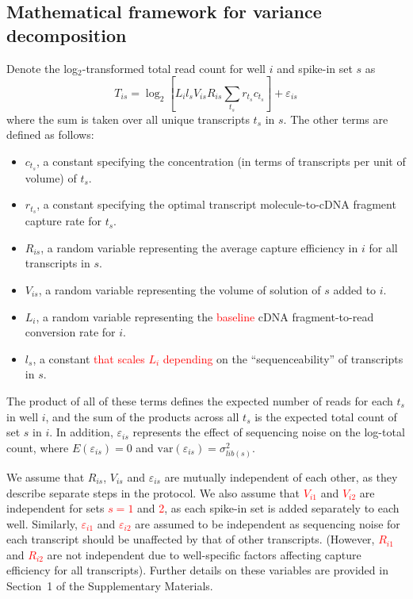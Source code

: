 \documentclass{article}
\newcommand{\suppsecmath}{1}
\newcommand{\revised}[1]{\textcolor{red}{#1}}
\newcommand\variance{\mbox{var}}
\begin{document}
\subsection*{Mathematical framework for variance decomposition}
Denote the log$_2$-transformed total read count for well $i$ and spike-in set $s$ as
\[
T_{is} = \log_2 \left[ L_i l_s V_{is} R_{is} \sum_{t_s} r_{t_s} c_{t_s} \right] + \varepsilon_{is}
\]
where the sum is taken over all unique transcripts $t_s$ in $s$.
The other terms are defined as follows:
\begin{itemize}
    \item $c_{t_s}$, a constant specifying the concentration (in terms of transcripts per unit of volume) of $t_s$.
    \item $r_{t_s}$, a constant specifying the optimal transcript molecule-to-cDNA fragment capture rate for $t_s$.
    \item $R_{is}$, a random variable representing the average capture efficiency in $i$ for all transcripts in $s$.
    \item $V_{is}$, a random variable representing the volume of solution of $s$ added to $i$.
    \item $L_i$, a random variable representing the \revised{baseline} cDNA fragment-to-read conversion rate for $i$.
    \item $l_s$, a constant \revised{that scales $L_i$ depending} on the ``sequenceability'' of transcripts in $s$.
\end{itemize}
The product of all of these terms defines the expected number of reads for each $t_s$ in well $i$, and the sum of the products across all $t_s$ is the expected total count of set $s$ in $i$.
In addition, $\varepsilon_{is}$ represents the effect of sequencing noise on the log-total count, where $E(\varepsilon_{is})=0$ and $\variance(\varepsilon_{is})= \sigma^2_{lib(s)}$.

We assume that $R_{is}$, $V_{is}$ and $\varepsilon_{is}$ are mutually independent of each other, as they describe separate steps in the protocol.
We also assume that \revised{$V_{i1}$} and \revised{$V_{i2}$} are independent for sets \revised{$s=1$} and \revised{2}, as each spike-in set is added separately to each well.
Similarly, \revised{$\varepsilon_{i1}$} and \revised{$\varepsilon_{i2}$} are assumed to be independent as sequencing noise for each transcript should be unaffected by that of other transcripts.
(However, \revised{$R_{i1}$} and \revised{$R_{i2}$} are not independent due to well-specific factors affecting capture efficiency for all transcripts).
Further details on these variables are provided in Section~\suppsecmath{} of the Supplementary Materials.
\end{document}
